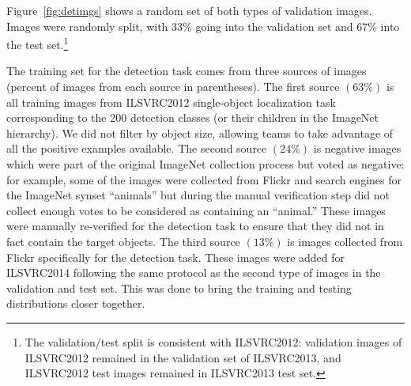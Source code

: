 \begin{table}
 Figure~\ref{fig:detimgs} shows a random set of both types of validation images. Images were randomly split, with $33\%$ going into the validation set and $67\%$ into the test set.\footnote{The validation/test split is consistent with ILSVRC2012:
validation images of ILSVRC2012 remained in the validation set of ILSVRC2013, and ILSVRC2012 test images remained in ILSVRC2013 test set.}

The training set for the detection task comes from three sources of images (percent of images from each source in parentheses). 
The first source $(63\%)$ is all training images from ILSVRC2012 single-object localization task corresponding
to the 200 detection classes (or their children in the ImageNet hierarchy). We did not filter by object size, allowing teams to take advantage of all the
positive examples available. The second source $(24\%)$ 
is negative images which were part of the original ImageNet collection process but voted as negative:
for example, some of the images were collected from Flickr and search engines for the ImageNet synset ``animals'' but during the manual
verification step did not collect enough votes to be considered as containing an ``animal.'' These images were manually re-verified for the detection task 
to ensure that they did not in fact contain the target objects.  The third source $(13\%)$ is images collected from Flickr specifically for the detection task. These images were added for ILSVRC2014 following the same protocol
as the second type of images in the validation and test set. This was done to bring the training and testing distributions closer together.













\end{table}
